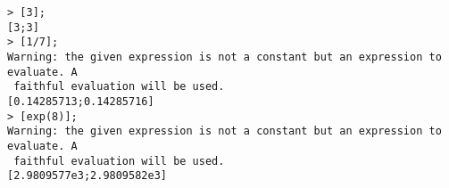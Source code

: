\begin{center}\begin{minipage}{15cm}\begin{Verbatim}[frame=single]
> [3];
[3;3]
> [1/7];
Warning: the given expression is not a constant but an expression to evaluate. A
 faithful evaluation will be used.
[0.14285713;0.14285716]
> [exp(8)];
Warning: the given expression is not a constant but an expression to evaluate. A
 faithful evaluation will be used.
[2.9809577e3;2.9809582e3]
\end{Verbatim}
\end{minipage}\end{center}
